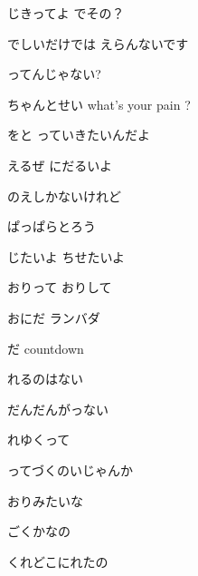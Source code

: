\documentclass[a4paper,tate,twocolumn,12pt]{ltjtarticle}
\begin{document}
\begin{flushleft}
\vspace{2em}

\noindent\begin{minipage}{\linewidth}
じきってよ でその？

でしいだけでは えらんないです

ってんじゃない?

ちゃんとせい what's your pain ?

をと っていきたいんだよ
\end{minipage}

\vspace{2em}

\noindent\begin{minipage}{\linewidth}
えるぜ にだるいよ

のえしかないけれど

ぱっぱらとろう

じたいよ ちせたいよ

おりって おりして

おにだ ランバダ

だ countdown
\end{minipage}

\vspace{2em}

\noindent\begin{minipage}{\linewidth}
れるのはない

だんだんがっない

れゆくって

ってづくのいじゃんか

おりみたいな

ごくかなの

くれどこにれたの
\end{minipage}

\vspace{2em}


\end{flushleft}
\end{document}
